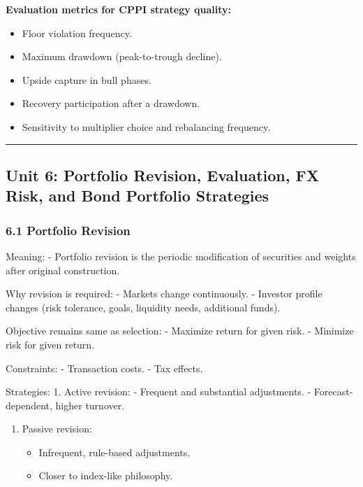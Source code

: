 \documentclass[
]{article}
\providecommand{\tightlist}{%
  \setlength{\itemsep}{0pt}\setlength{\parskip}{0pt}}
\begin{document}
\textbf{Evaluation metrics for CPPI strategy quality:}
\begin{itemize}
\item Floor violation frequency.
\item Maximum drawdown (peak-to-trough decline).
\item Upside capture in bull phases.
\item Recovery participation after a drawdown.
\item Sensitivity to multiplier choice and rebalancing frequency.
\end{itemize}

\begin{center}\rule{0.5\linewidth}{0.5pt}\end{center}

\hypertarget{unit-6-portfolio-revision-evaluation-fx-risk-and-bond-portfolio-strategies}{%
\subsection{Unit 6: Portfolio Revision, Evaluation, FX Risk, and Bond
Portfolio
Strategies}\label{unit-6-portfolio-revision-evaluation-fx-risk-and-bond-portfolio-strategies}}

\hypertarget{portfolio-revision}{%
\subsubsection{6.1 Portfolio Revision}\label{portfolio-revision}}

Meaning: - Portfolio revision is the periodic modification of securities
and weights after original construction.

Why revision is required: - Markets change continuously. - Investor
profile changes (risk tolerance, goals, liquidity needs, additional
funds).

Objective remains same as selection: - Maximize return for given risk. -
Minimize risk for given return.

Constraints: - Transaction costs. - Tax effects.

Strategies: 1. Active revision: - Frequent and substantial adjustments.
- Forecast-dependent, higher turnover.

\begin{enumerate}
\def\labelenumi{\arabic{enumi}.}
\setcounter{enumi}{1}
\tightlist
\item
  Passive revision:

  \begin{itemize}
  \tightlist
  \item
    Infrequent, rule-based adjustments.
  \item
    Closer to index-like philosophy.
  \end{itemize}
\end{enumerate}
\end{document}
